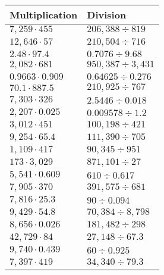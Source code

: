 \begin{longtable}[]{@{}ll@{}}
\toprule
Multiplication & Division\tabularnewline
\midrule
\endhead
\(7,259\cdot455\) & \(206,388÷819\)\tabularnewline
\(12,646\cdot57\) & \(210,504÷716\)\tabularnewline
\(2.48\cdot97.4\) & \(0.7076÷9.68\)\tabularnewline
\(2,082\cdot681\) & \(950,387÷3,431\)\tabularnewline
\(0.9663\cdot0.909\) & \(0.64625÷0.276\)\tabularnewline
\(70.1\cdot887.5\) & \(210,925÷767\)\tabularnewline
\(7,303\cdot326\) & \(2.5446÷0.018\)\tabularnewline
\(2,207\cdot0.025\) & \(0.009578÷1.2\)\tabularnewline
\(3,012\cdot451\) & \(100,198÷421\)\tabularnewline
\(9,254\cdot65.4\) & \(111,390÷705\)\tabularnewline
\(1,109\cdot417\) & \(90,345÷951\)\tabularnewline
\(173\cdot3,029\) & \(871,101÷27\)\tabularnewline
\(5,541\cdot0.609\) & \(610÷0.617\)\tabularnewline
\(7,905\cdot370\) & \(391,575÷681\)\tabularnewline
\(7,816\cdot25.3\) & \(90÷0.094\)\tabularnewline
\(9,429\cdot54.8\) & \(70,384÷8,798\)\tabularnewline
\(8,656\cdot0.026\) & \(181,482÷298\)\tabularnewline
\(42,729\cdot84\) & \(27,148÷67.3\)\tabularnewline
\(9,740\cdot0.439\) & \(60÷0.925\)\tabularnewline
\(7,397\cdot419\) & \(34,340÷79.3\)\tabularnewline
\bottomrule
\end{longtable}
